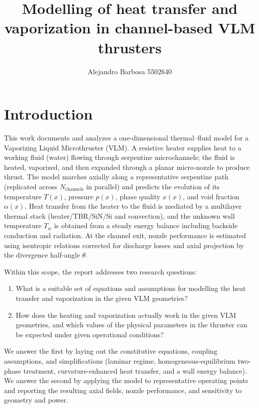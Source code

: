 \documentclass[11pt,a4paper]{article}
\title{Modelling of heat transfer and vaporization in channel-based VLM thrusters}
\author{Alejandro Barbosa 5502640}
\date{}
\begin{document}
\maketitle

\section{Introduction}
This work documents and analyzes a one-dimensional thermal--fluid model for a Vaporizing Liquid Microthruster (VLM). A resistive heater supplies heat to a working fluid (water) flowing through serpentine microchannels; the fluid is heated,  vaporized, and then expanded through a planar micro-nozzle to produce thrust. The model marches axially along a representative serpentine path (replicated across \(N_\text{channels}\) in parallel) and predicts the evolution of its temperature \(T(x)\), pressure \(p(x)\), phase quality \(x(x)\), and void fraction \(\alpha(x)\). Heat transfer from the heater to the fluid is mediated by a multilayer thermal stack (heater/TBR/SiN/Si and convection), and the unknown wall temperature \(T_w\) is obtained from a steady energy balance including backside conduction and radiation. At the channel exit, nozzle performance is estimated using isentropic relations corrected for discharge losses and axial projection by the divergence half-angle \(\theta\).

Within this scope, the report addresses two research questions:
\begin{tcolorbox}[colback=blue!2!white,colframe=blue!40!black,title=Research questions,left=1mm,right=1mm,top=0.6mm,bottom=0.6mm]
\begin{enumerate}[leftmargin=*]
  \item What is a suitable set of equations and assumptions for modelling the heat transfer and vaporization in the given VLM geometries?
  \item How does the heating and vaporization actually work in the given VLM geometries, and which values of the physical parameters in the thruster can be expected under given operational conditions?
\end{enumerate}
\end{tcolorbox}
We answer the first by laying out the constitutive equations, coupling assumptions, and simplifications (laminar regime, homogeneous-equilibrium two-phase treatment, curvature-enhanced heat transfer, and a wall energy balance). We answer the second by applying the model to representative operating points and reporting the resulting axial fields, nozzle performance, and sensitivity to geometry and power.
\end{document}

